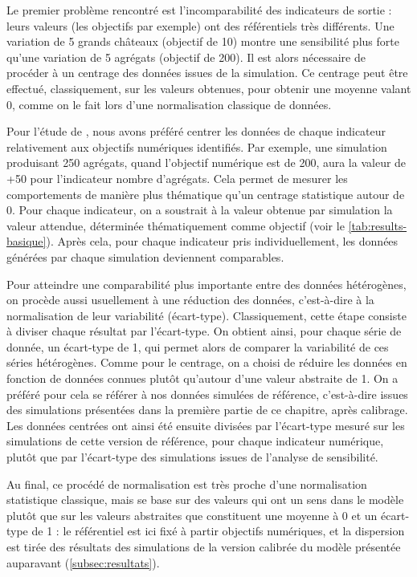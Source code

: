 Le premier problème rencontré est l'incomparabilité des indicateurs de sortie : leurs valeurs (les objectifs par exemple) ont des référentiels très différents.
Une variation de 5 grands châteaux (objectif de 10) montre une sensibilité plus forte qu'une variation de 5 agrégats (objectif de 200).
Il est alors nécessaire de procéder à un centrage des données issues de la simulation.
Ce centrage peut être effectué, classiquement, sur les valeurs obtenues, pour obtenir une moyenne valant 0, comme on le fait lors d'une normalisation classique de données.

Pour l'étude de \simfeodal{}, nous avons préféré centrer les données de chaque indicateur relativement aux objectifs numériques identifiés.
Par exemple, une simulation produisant 250 agrégats, quand l'objectif numérique est de 200, aura la valeur de +50 pour l'indicateur \og nombre d'agrégats\fg{}.
Cela permet de mesurer les comportements de manière plus thématique qu'un centrage statistique autour de 0.
Pour chaque indicateur, on a soustrait à la valeur obtenue par simulation la \og valeur attendue\fg{}, déterminée thématiquement comme objectif (voir le \cref{tab:results-basique}).
Après cela, pour chaque indicateur pris individuellement, les données générées par chaque simulation deviennent comparables.

Pour atteindre une comparabilité plus importante entre des données hétérogènes, on procède aussi usuellement à une \og réduction\fg{} des données, c'est-à-dire à la normalisation de leur variabilité (écart-type).
Classiquement, cette étape consiste à diviser chaque résultat par l'écart-type.
On obtient ainsi, pour chaque série de donnée, un écart-type de 1, qui permet alors de comparer la variabilité de ces séries hétérogènes.
Comme pour le centrage, on a choisi de réduire les données en fonction de données connues plutôt qu'autour d'une valeur abstraite de 1.
On a préféré pour cela se référer à nos données simulées de référence, c'est-à-dire issues des simulations présentées dans la première partie de ce chapitre, après calibrage.
Les données centrées ont ainsi été ensuite divisées par l'écart-type mesuré sur les simulations de cette version de référence, pour chaque indicateur numérique, plutôt que par l'écart-type des simulations issues de l'analyse de sensibilité.

Au final, ce procédé de normalisation est très proche d'une normalisation statistique classique, mais se base sur des valeurs qui ont un sens dans le modèle plutôt que sur les valeurs \og abstraites\fg{} que constituent une moyenne à 0 et un écart-type de 1 : le référentiel est ici fixé à partir objectifs numériques, et la dispersion est tirée des résultats des simulations de la version calibrée du modèle présentée auparavant (\cref{subsec:resultats}).

